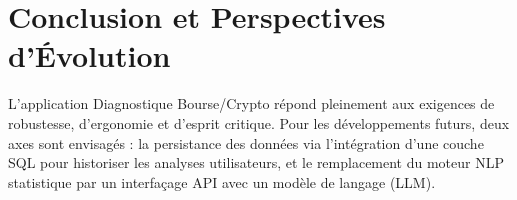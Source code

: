 \documentclass[11pt,a4paper]{article}
\begin{document}
\section{Conclusion et Perspectives d'Évolution}
L'application Diagnostique Bourse/Crypto répond pleinement aux exigences de robustesse, d'ergonomie et d'esprit critique. Pour les développements futurs, deux axes sont envisagés : la persistance des données via l'intégration d'une couche SQL pour historiser les analyses utilisateurs, et le remplacement du moteur NLP statistique par un interfaçage API avec un modèle de langage (LLM).
\end{document}
